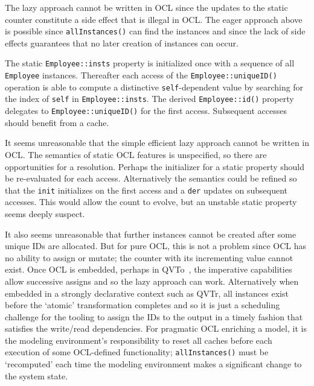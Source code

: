 \documentclass[sigconf]{acmart}
\begin{document}
The lazy approach cannot be written in OCL since the updates to the static counter constitute a side effect that is illegal in OCL. The eager approach above is possible since \verb|allInstances()| can find the instances and since the lack of side effects guarantees that no later creation of instances can occur.

The static \verb|Employee::insts| property is initialized once with a sequence of all \verb|Employee| instances. Thereafter each access of the \verb|Employee::uniqueID()| operation is able to compute a distinctive \verb|self|-dependent value by searching for the index of \verb|self| in \verb|Employee::insts|. The derived \verb|Employee::id()| property delegates to \verb|Employee::uniqueID()| for the first access. Subsequent accesses should benefit from a cache.

It seems unreasonable that the simple efficient lazy approach cannot be written in OCL. The semantics of static OCL features is unspecified, so there are opportunities for a resolution. Perhaps the initializer for a static property should be re-evaluated for each access. Alternatively the semantics could be refined so that the \verb|init| initializes on the first access and a \verb|der| updates on subsequent accesses. This would allow the count to evolve, but an unstable static property seems deeply suspect.

It also seems unreasonable that further instances cannot be created after some unique IDs are allocated. But for pure OCL, this is not a problem since OCL has no ability to assign or mutate; the counter with its incrementing value cannot exist. Once OCL is embedded, perhaps in QVTo~\cite{QVT-1.3}, the imperative capabilities allow successive assigns and so the lazy approach can work. Alternatively when embedded in a strongly declarative context such as QVTr, all instances exist before the `atomic' transformation completes and so it is just a scheduling challenge for the tooling to assign the IDs to the output in a timely fashion that satisfies the write/read dependencies. For pragmatic OCL enriching a model, it is the modeling environment's responsibility to reset all caches before each execution of some OCL-defined functionality; \verb|allInstances()| must be `recomputed' each time the modeling environment makes a significant change to the system state. 

\end{document}
